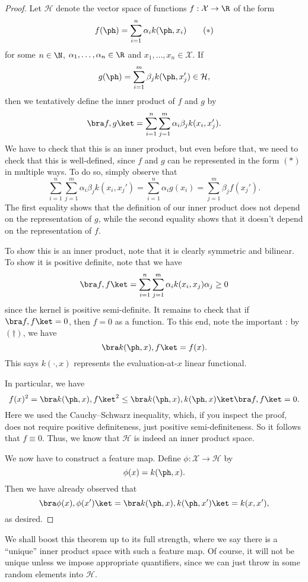 \documentclass[a4paper]{article}
\begin{document}
\begin{proof}
  Let $\mathcal{H}$ denote the vector space of functions $f: \mathcal{X} \to \R$ of the form
  \[
    f(\ph) = \sum_{i = 1}^n \alpha_i k(\ph, x_i)\tag{$*$}
  \]
  for some $n \in \N$, $\alpha_1, \ldots, \alpha_n \in \R$ and $x_1, \ldots, x_n \in \mathcal{X}$. If
  \[
    g(\ph) = \sum_{i = 1}^m \beta_j k(\ph, x_j') \in \mathcal{H},
  \]
  then we tentatively define the inner product of $f$ and $g$ by
  \[
    \bra f, g\ket = \sum_{i = 1}^n \sum_{j = 1}^m \alpha_i \beta_j k(x_i, x_j').
  \]
  We have to check that this is an inner product, but even before that, we need to check that this is well-defined, since $f$ and $g$ can be represented in the form $(*)$ in multiple ways. To do so, simply observe that
  \[
    \sum_{i = 1}^n \sum_{j = 1}^m \alpha_i \beta_j k(x_i, x_j') = \sum_{i = 1}^n \alpha_i g(x_i) = \sum_{j = 1}^m \beta_j f(x_j').\tag{$\dagger$}
  \]
  The first equality shows that the definition of our inner product does not depend on the representation of $g$, while the second equality shows that it doesn't depend on the representation of $f$.

  To show this is an inner product, note that it is clearly symmetric and bilinear. To show it is positive definite, note that we have
  \[
    \bra f, f \ket = \sum_{i = 1}^n \sum_{j = 1}^m \alpha_i k(x_i, x_j) \alpha_j \geq 0
  \]
  since the kernel is positive semi-definite. It remains to check that if $\bra f, f\ket = 0$, then $f = 0$ as a function. To this end, note the important : by $(\dagger)$, we have
  \[
    \bra k(\ph, x), f\ket = f(x).
  \]
  This says $k(\cdot, x)$ represents the evaluation-at-$x$ linear functional.

  In particular, we have
  \[
    f(x)^2 = \bra k(\ph, x), f\ket^2 \leq \bra k(\ph, x), k(\ph, x)\ket \bra f, f\ket = 0.
  \]
  Here we used the Cauchy--Schwarz inequality, which, if you inspect the proof, does not require positive definiteness, just positive semi-definiteness. So it follows that $f \equiv 0$. Thus, we know that $\mathcal{H}$ is indeed an inner product space.

  We now have to construct a feature map. Define $\phi: \mathcal{X} \to \mathcal{H}$ by
  \[
    \phi(x) = k(\ph, x).
  \]
  Then we have already observed that
  \[
    \bra \phi(x), \phi(x')\ket = \bra k(\ph, x), k(\ph, x')\ket = k(x, x'),
  \]
  as desired.
\end{proof}

We shall boost this theorem up to its full strength, where we say there is a ``unique'' inner product space with such a feature map. Of course, it will not be unique unless we impose appropriate quantifiers, since we can just throw in some random elements into $\mathcal{H}$.
\end{document}
